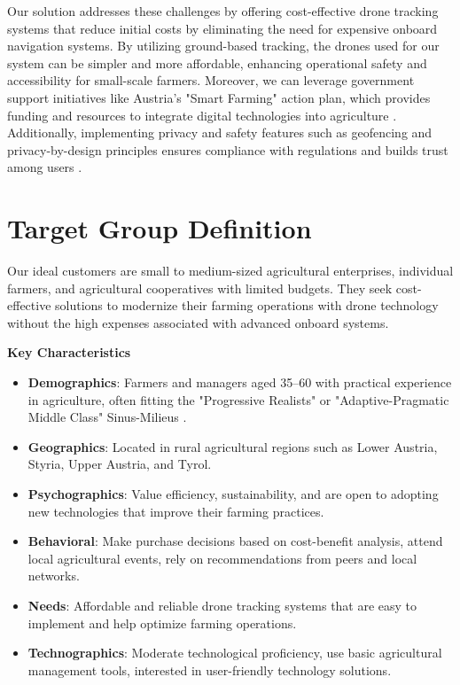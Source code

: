 Our solution addresses these challenges by offering cost-effective drone tracking systems that reduce initial costs by eliminating the need for expensive onboard navigation systems. By utilizing ground-based tracking, the drones used for our system can be simpler and more affordable, enhancing operational safety and accessibility for small-scale farmers. Moreover, we can leverage government support initiatives like Austria's "Smart Farming" action plan, which provides funding and resources to integrate digital technologies into agriculture \citep{smartfarming2023}. Additionally, implementing privacy and safety features such as geofencing and privacy-by-design principles ensures compliance with regulations and builds trust among users \citep{secure_redact_drones_privacy}.

\section{Target Group Definition}

Our ideal customers are small to medium-sized agricultural enterprises, individual farmers, and agricultural cooperatives with limited budgets. They seek cost-effective solutions to modernize their farming operations with drone technology without the high expenses associated with advanced onboard systems.

\textbf{Key Characteristics}

\begin{itemize}
	\item \textbf{Demographics}: Farmers and managers aged 35--60 with practical experience in agriculture, often fitting the "Progressive Realists" or "Adaptive-Pragmatic Middle Class" Sinus-Milieus  \cite{sinus_institut_2024}. 
	\item \textbf{Geographics}: Located in rural agricultural regions such as Lower Austria, Styria, Upper Austria, and Tyrol. 
	\item \textbf{Psychographics}: Value efficiency, sustainability, and are open to adopting new technologies that improve their farming practices. 
	\item \textbf{Behavioral}: Make purchase decisions based on cost-benefit analysis, attend local agricultural events, rely on recommendations from peers and local networks. 
	\item \textbf{Needs}: Affordable and reliable drone tracking systems that are easy to implement and help optimize farming operations. 
	\item \textbf{Technographics}: Moderate technological proficiency, use basic agricultural management tools, interested in user-friendly technology solutions. 
\end{itemize}

